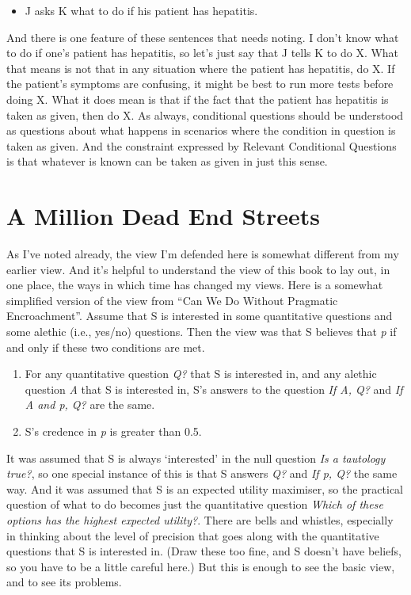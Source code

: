 \documentclass[
  12pt,
  letterpaper,
]{scrbook}
\providecommand{\tightlist}{%
  \setlength{\itemsep}{0pt}\setlength{\parskip}{0pt}}\usepackage{longtable,booktabs,array}
\begin{document}
\begin{itemize}
\tightlist
\item
  J asks K what to do if his patient has hepatitis.
\end{itemize}

And there is one feature of these sentences that needs noting. I don't
know what to do if one's patient has hepatitis, so let's just say that J
tells K to do X. What that means is not that in any situation where the
patient has hepatitis, do X. If the patient's symptoms are confusing, it
might be best to run more tests before doing X. What it does mean is
that if the fact that the patient has hepatitis is taken as given, then
do X. As always, conditional questions should be understood as questions
about what happens in scenarios where the condition in question is taken
as given. And the constraint expressed by Relevant Conditional Questions
is that whatever is known can be taken as given in just this sense.

\section{A Million Dead End Streets}\label{sec-mychanges}

As I've noted already, the view I'm defended here is somewhat different
from my earlier view. And it's helpful to understand the view of this
book to lay out, in one place, the ways in which time has changed my
views. Here is a somewhat simplified version of the view from ``Can We
Do Without Pragmatic Encroachment''. Assume that S is interested in some
quantitative questions and some alethic (i.e., yes/no) questions. Then
the view was that S believes that \emph{p} if and only if these two
conditions are met.

\begin{enumerate}
\def\labelenumi{\arabic{enumi}.}
\tightlist
\item
  For any quantitative question \emph{Q?} that S is interested in, and
  any alethic question \emph{A} that S is interested in, S's answers to
  the question \emph{If A, Q?} and \emph{If A and p, Q?} are the same.
\item
  S's credence in \emph{p} is greater than 0.5.
\end{enumerate}

It was assumed that S is always `interested' in the null question
\emph{Is a tautology true?}, so one special instance of this is that S
answers \emph{Q?} and \emph{If p, Q?} the same way. And it was assumed
that S is an expected utility maximiser, so the practical question of
what to do becomes just the quantitative question \emph{Which of these
options has the highest expected utility?}. There are bells and
whistles, especially in thinking about the level of precision that goes
along with the quantitative questions that S is interested in. (Draw
these too fine, and S doesn't have beliefs, so you have to be a little
careful here.) But this is enough to see the basic view, and to see its
problems.
\end{document}

